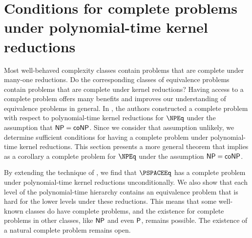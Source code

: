 \section
    [Conditions for complete problems under polynomial-time kernel reductions]
    {Conditions for complete problems \\ under polynomial-time kernel reductions}
\label{sec:generalcompleteness}
%
Most well-behaved complexity classes contain problems that are complete under many-one reductions.
Do the corresponding classes of equivalence problems contain problems that are complete under kernel reductions?
Having access to a complete problem offers many benefits and improves our understanding of equivalence problems in general.
In \autocite[Theorem~8.7]{bcffm}, the authors constructed a complete problem with respect to polynomial-time kernel reductions for $\NPEq$ under the assumption that $\NP = \coNP$.
Since we consider that assumption unlikely, we determine sufficient conditions for having a complete problem under polynomial-time kernel reductions.
This section presents a more general theorem that implies as a corollary a complete problem for $\NPEq$ under the assumption $\NP = \coNP$.

%
By extending the technique of \autocite[Theorem~8.7]{bcffm}, we find that $\PSPACEEq$ has a complete problem under polynomial-time kernel reductions unconditionally.
We also show that each level of the polynomial-time hierarchy contains an equivalence problem that is hard for the lower levels under these reductions.
This means that some well-known classes do have complete problems, and the existence for complete problems in other classes, like $\NP$ and even $\P$, remains possible.
The existence of a natural complete problem remains open.

